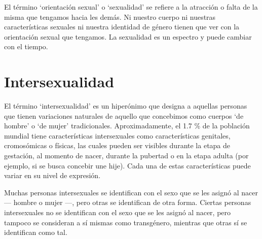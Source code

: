 \documentclass[12pt,openany]{book}
\begin{document}
El término `orientación sexual' o `sexualidad' se refiere a la atracción o falta de la misma que tengamos hacia les demás. Ni nuestro cuerpo ni nuestras características sexuales ni nuestra identidad de género tienen que ver con la orientación sexual que tengamos. La sexualidad es un espectro y puede cambiar con el tiempo.

\begin{figure}[h]
    \centering
\end{figure}

\section*{Intersexualidad}

El término `intersexualidad' es un hiperónimo que designa a aquellas personas que tienen variaciones naturales de aquello que concebimos  como cuerpos `de hombre' o `de mujer' tradicionales. Aproximadamente, el 1.7 \% de la población mundial tiene características intersexuales como características genitales, cromosómicas o físicas, las cuales pueden ser visibles durante la etapa de gestación, al momento de nacer, durante la pubertad o en la etapa adulta (por ejemplo, si se busca concebir une hije). Cada una de estas características puede variar en su nivel de expresión.

Muchas personas intersexuales se identifican con el sexo que se les asignó al nacer --- hombre o mujer ---, pero otras se identifican de otra forma. Ciertas personas intersexuales no se identifican con el sexo que se les asignó al nacer, pero tampoco se consideran a sí mismas como transgénero, mientras que otras sí se identifican como tal. 
\end{document}
